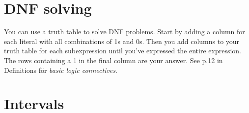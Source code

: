 \documentclass[twocolumn,a4paper]{article}
\begin{document}
\section*{DNF solving}
You can use a truth table to solve DNF problems.
Start by adding a column for each literal with all combinations of 1s and 0s.
Then you add columns to your truth table for each subexpression until you've expressed the entire expression.
The rows containing a 1 in the final column are your answer.
See p.12 in Definitions för \emph{basic logic connectives}.
\begin{figure}[ht]
	\centering
\end{figure}

\newpage
\section*{Intervals}
\end{document}

